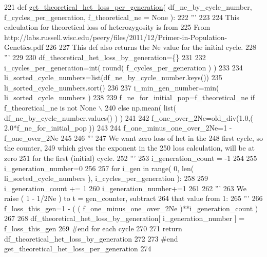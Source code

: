 \begin{DoxyCode}
221 \textcolor{keyword}{def }\hyperlink{namespacenegui_1_1pgvalidationtests_ab5c519679dcc75c116bcbd7883107cfb}{get\_theoretical\_het\_loss\_per\_generation}( df\_ne\_by\_cycle\_number, 
      f\_cycles\_per\_generation, f\_theoretical\_ne = None ):
222     \textcolor{stringliteral}{'''}
223 \textcolor{stringliteral}{}
224 \textcolor{stringliteral}{    This calculation for theoretical loss of heterozygosity is from}
225 \textcolor{stringliteral}{    From http://labs.russell.wisc.edu/peery/files/2011/12/Primer-in-Population-Genetics.pdf}
226 \textcolor{stringliteral}{}
227 \textcolor{stringliteral}{    This def also returns the Ne value for the initial cycle.}
228 \textcolor{stringliteral}{    '''}
229 
230     df\_theoretical\_het\_loss\_by\_generation=\{\}
231 
232     i\_cycles\_per\_generation=int( round( f\_cycles\_per\_generation ) )
233 
234     li\_sorted\_cycle\_numbers=list(df\_ne\_by\_cycle\_number.keys())
235     li\_sorted\_cycle\_numbers.sort()
236 
237     i\_min\_gen\_number=min( li\_sorted\_cycle\_numbers )
238 
239     f\_ne\_for\_initial\_pop=f\_theoretical\_ne \textcolor{keywordflow}{if} f\_theoretical\_ne \textcolor{keywordflow}{is} \textcolor{keywordflow}{not} \textcolor{keywordtype}{None} \(\backslash\)
240             \textcolor{keywordflow}{else} np.mean( list( df\_ne\_by\_cycle\_number.values() ) )  
241 
242     f\_one\_over\_2Ne=old\_div(1.0,( 2.0*f\_ne\_for\_initial\_pop ))
243 
244     f\_one\_minus\_one\_over\_2Ne=1 - f\_one\_over\_2Ne
245 
246     \textcolor{stringliteral}{'''}
247 \textcolor{stringliteral}{    We want zero loss of het in the}
248 \textcolor{stringliteral}{    first cycle, so the counter,}
249 \textcolor{stringliteral}{    which gives the exponent in the }
250 \textcolor{stringliteral}{    loss calculation, will be at zero}
251 \textcolor{stringliteral}{    for the first (initial) cycle. }
252 \textcolor{stringliteral}{    '''}
253     i\_generation\_count = -1
254 
255     i\_generation\_number=0
256 
257     \textcolor{keywordflow}{for} i\_gen \textcolor{keywordflow}{in} range( 0, len( li\_sorted\_cycle\_numbers ), i\_cycles\_per\_generation ):
258 
259         i\_generation\_count += 1
260         i\_generation\_number+=1
261 
262         \textcolor{stringliteral}{'''}
263 \textcolor{stringliteral}{        We raise ( 1 - 1/2Ne ) to  t = gen\_counter, subtract}
264 \textcolor{stringliteral}{        that value from 1:}
265 \textcolor{stringliteral}{        '''}
266         f\_loss\_this\_gen=1 - (  ( f\_one\_minus\_one\_over\_2Ne )**i\_generation\_count  )
267 
268         df\_theoretical\_het\_loss\_by\_generation[ i\_generation\_number ] = f\_loss\_this\_gen
269     \textcolor{comment}{#end for each cycle}
270     
271     \textcolor{keywordflow}{return}  df\_theoretical\_het\_loss\_by\_generation
272 
273 \textcolor{comment}{#end get\_theoretical\_het\_loss\_per\_generation}
274 
\end{DoxyCode}
